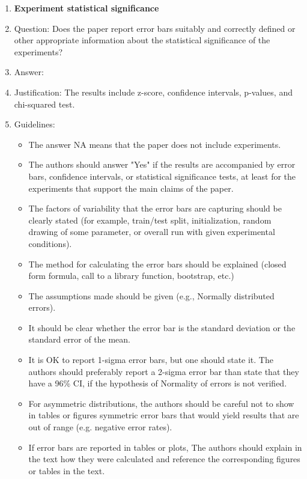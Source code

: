 \documentclass{article}
\begin{document}
\begin{enumerate}
\item {\bf Experiment statistical significance}
    \item[] Question: Does the paper report error bars suitably and correctly defined or other appropriate information about the statistical significance of the experiments?
    \item[] Answer: \answerYes{} %
    \item[] Justification: The results include z-score, confidence intervals, p-values, and chi-squared test.  
    \item[] Guidelines:
    \begin{itemize}
        \item The answer NA means that the paper does not include experiments.
        \item The authors should answer "Yes" if the results are accompanied by error bars, confidence intervals, or statistical significance tests, at least for the experiments that support the main claims of the paper.
        \item The factors of variability that the error bars are capturing should be clearly stated (for example, train/test split, initialization, random drawing of some parameter, or overall run with given experimental conditions).
        \item The method for calculating the error bars should be explained (closed form formula, call to a library function, bootstrap, etc.)
        \item The assumptions made should be given (e.g., Normally distributed errors).
        \item It should be clear whether the error bar is the standard deviation or the standard error of the mean.
        \item It is OK to report 1-sigma error bars, but one should state it. The authors should preferably report a 2-sigma error bar than state that they have a 96\% CI, if the hypothesis of Normality of errors is not verified.
        \item For asymmetric distributions, the authors should be careful not to show in tables or figures symmetric error bars that would yield results that are out of range (e.g. negative error rates).
        \item If error bars are reported in tables or plots, The authors should explain in the text how they were calculated and reference the corresponding figures or tables in the text.
    \end{itemize}


\end{enumerate}
\end{document}
